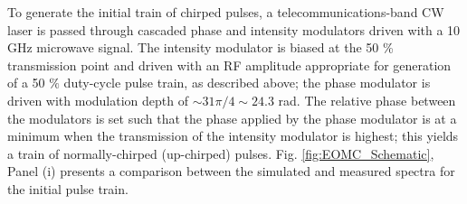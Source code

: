 To generate the initial train of chirped pulses, a telecommunications-band CW laser is passed through cascaded phase and intensity modulators driven with a 10 GHz microwave signal. The intensity modulator is biased at the 50 \% transmission point and driven with an RF amplitude appropriate for generation of a 50 $\%$ duty-cycle pulse train, as described above;  the phase modulator is driven with modulation depth of $\sim31\pi/4\sim24.3$ rad. The relative phase between the modulators is set such that the phase applied by the phase modulator is at a minimum when the transmission of the intensity modulator is highest; this yields a train of normally-chirped (up-chirped) pulses. Fig. \ref{fig:EOMC_Schematic}, Panel (i) presents a comparison between the simulated and measured spectra for the initial pulse train. 




